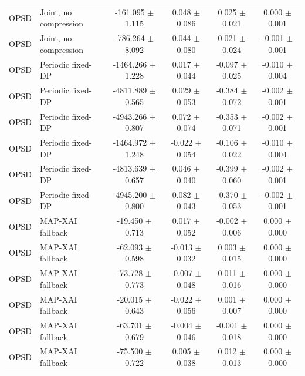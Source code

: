 \begin{tabular}{llcccc}
OPSD & Joint, no compression & -161.095 $\pm$ 1.115 & 0.048 $\pm$ 0.086 & 0.025 $\pm$ 0.021 & 0.000 $\pm$ 0.001 \\
OPSD & Joint, no compression & -786.264 $\pm$ 8.092 & 0.044 $\pm$ 0.080 & 0.021 $\pm$ 0.024 & -0.001 $\pm$ 0.001 \\
OPSD & Periodic fixed-DP & -1464.266 $\pm$ 1.228 & 0.017 $\pm$ 0.044 & -0.097 $\pm$ 0.025 & -0.010 $\pm$ 0.004 \\
OPSD & Periodic fixed-DP & -4811.889 $\pm$ 0.565 & 0.029 $\pm$ 0.053 & -0.384 $\pm$ 0.072 & -0.002 $\pm$ 0.001 \\
OPSD & Periodic fixed-DP & -4943.266 $\pm$ 0.807 & 0.072 $\pm$ 0.074 & -0.353 $\pm$ 0.071 & -0.002 $\pm$ 0.001 \\
OPSD & Periodic fixed-DP & -1464.972 $\pm$ 1.248 & -0.022 $\pm$ 0.054 & -0.106 $\pm$ 0.022 & -0.010 $\pm$ 0.004 \\
OPSD & Periodic fixed-DP & -4813.639 $\pm$ 0.657 & 0.046 $\pm$ 0.040 & -0.399 $\pm$ 0.060 & -0.002 $\pm$ 0.001 \\
OPSD & Periodic fixed-DP & -4945.200 $\pm$ 0.800 & 0.082 $\pm$ 0.043 & -0.370 $\pm$ 0.053 & -0.002 $\pm$ 0.001 \\
OPSD & MAP-XAI fallback & -19.450 $\pm$ 0.713 & 0.017 $\pm$ 0.052 & -0.002 $\pm$ 0.006 & 0.000 $\pm$ 0.000 \\
OPSD & MAP-XAI fallback & -62.093 $\pm$ 0.598 & -0.013 $\pm$ 0.032 & 0.003 $\pm$ 0.015 & 0.000 $\pm$ 0.000 \\
OPSD & MAP-XAI fallback & -73.728 $\pm$ 0.773 & -0.007 $\pm$ 0.048 & 0.011 $\pm$ 0.016 & 0.000 $\pm$ 0.000 \\
OPSD & MAP-XAI fallback & -20.015 $\pm$ 0.643 & -0.022 $\pm$ 0.056 & 0.001 $\pm$ 0.007 & 0.000 $\pm$ 0.000 \\
OPSD & MAP-XAI fallback & -63.701 $\pm$ 0.679 & -0.004 $\pm$ 0.046 & -0.001 $\pm$ 0.018 & 0.000 $\pm$ 0.000 \\
OPSD & MAP-XAI fallback & -75.500 $\pm$ 0.722 & 0.005 $\pm$ 0.038 & 0.012 $\pm$ 0.013 & 0.000 $\pm$ 0.000 \\
\bottomrule
\end{tabular}
